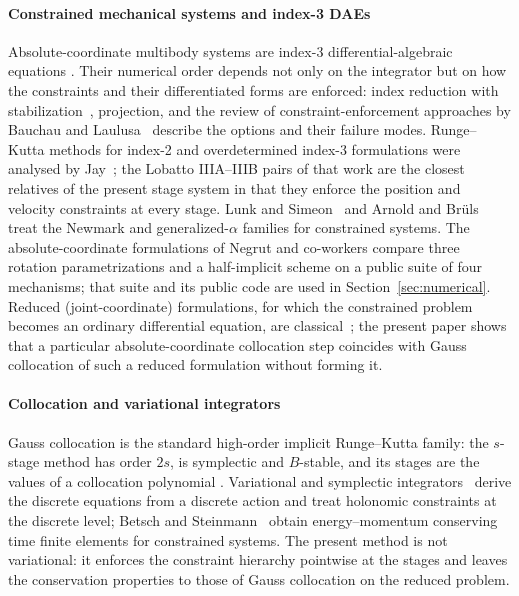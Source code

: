 \documentclass[preprint,12pt]{elsarticle}
\begin{document}
\paragraph{Constrained mechanical systems and index-3 DAEs}
Absolute-coordinate multibody systems are index-3 differential-algebraic equations
\cite{hairer1993solving,ascher1998computer,petzold1986numerical}. Their numerical order depends
not only on the integrator but on how the constraints and their differentiated forms are enforced:
index reduction with stabilization~\cite{gear1985automatic}, projection, and the review of
constraint-enforcement approaches by Bauchau and Laulusa~\cite{bauchau2008review} describe the
options and their failure modes. Runge--Kutta methods for index-2 and overdetermined index-3
formulations were analysed by Jay~\cite{jay1996symplectic,jay2006specialized,jay2007specialized};
the Lobatto IIIA--IIIB pairs of that work are the closest relatives of the present stage system in
that they enforce the position and velocity constraints at every stage. Lunk and
Simeon~\cite{lunk2006solving} and Arnold and Br\"uls~\cite{arnold2007convergence} treat the
Newmark and generalized-$\alpha$ families for constrained systems. The absolute-coordinate
formulations of Negrut and co-workers
\cite{taves2020exponential,kissel2021dwelling,kissel2022absolute,fang2023halfimplicit,kissel2024velocitypartitioning}
compare three rotation parametrizations and a half-implicit scheme on a public suite of four
mechanisms; that suite and its public code are used in Section~\ref{sec:numerical}. Reduced
(joint-coordinate) formulations, for which the constrained problem becomes an ordinary
differential equation, are classical~\cite{nikravesh1988computer,shabana2020dynamics,jain2011robot};
the present paper shows that a particular absolute-coordinate collocation step coincides with
Gauss collocation of such a reduced formulation without forming it.

\paragraph{Collocation and variational integrators}
Gauss collocation is the standard high-order implicit Runge--Kutta family: the $s$-stage method has
order $2s$, is symplectic and $B$-stable, and its stages are the values of a collocation polynomial
\cite{hairer1993nonstiff,butcher2016numerical,hairer2006geometric}. Variational and symplectic
integrators~\cite{marsden2001discrete,leyendecker2008variational,leok2012prolongation,bourabee2009hamilton}
derive the discrete equations from a discrete action and treat holonomic constraints at the
discrete level; Betsch and Steinmann~\cite{betsch2002conservation} obtain energy--momentum
conserving time finite elements for constrained systems. The present method is not variational: it
enforces the constraint hierarchy pointwise at the stages and leaves the conservation properties
to those of Gauss collocation on the reduced problem.
\end{document}
